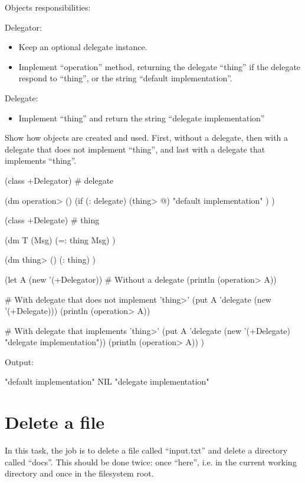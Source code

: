 Objects responsibilities:

Delegator:

\begin{itemize}
\item
  Keep an optional delegate instance.
\item
  Implement ``operation'' method, returning the delegate ``thing'' if
  the delegate respond to ``thing'', or the string ``default
  implementation''.
\end{itemize}

Delegate:

\begin{itemize}
\item
  Implement ``thing'' and return the string ``delegate implementation''
\end{itemize}

Show how objects are created and used. First, without a delegate, then
with a delegate that does not implement ``thing'', and last with a
delegate that implements ``thing''.



\begin{wideverbatim}

(class +Delegator)
# delegate

(dm operation> ()
   (if (: delegate)
      (thing> @)
      "default implementation" ) )


(class +Delegate)
# thing

(dm T (Msg)
   (=: thing Msg) )

(dm thing> ()
   (: thing) )


(let A (new '(+Delegator))
   # Without a delegate
   (println (operation> A))

   # With delegate that does not implement 'thing>'
   (put A 'delegate (new '(+Delegate)))
   (println (operation> A))

   # With delegate that implements 'thing>'
   (put A 'delegate (new '(+Delegate) "delegate implementation"))
   (println (operation> A)) )

Output:

"default implementation"
NIL
"delegate implementation"

\end{wideverbatim}

\pagebreak{}
\section*{Delete a file}

In this task, the job is to delete a file called ``input.txt'' and
delete a directory called ``docs''. This should be done twice: once
``here'', i.e. in the current working directory and once in the
filesystem root.


